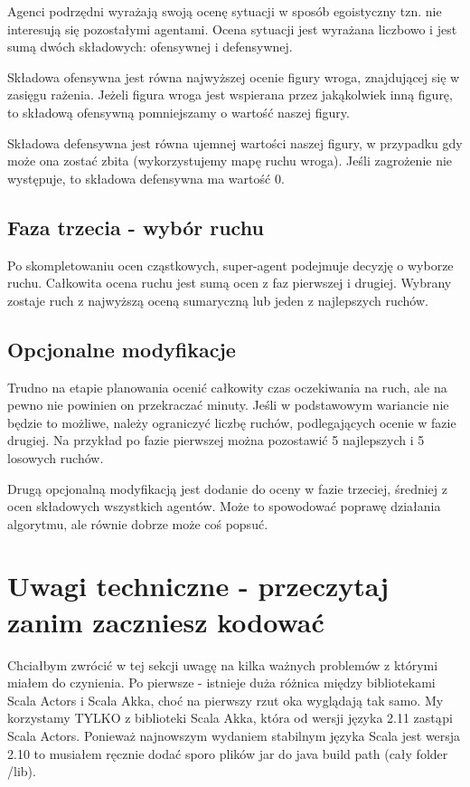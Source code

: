 \documentclass[a4paper,12pt,oneside,notitlepage,onecolumn]{article}
\begin{document}
Agenci podrzędni wyrażają swoją ocenę sytuacji w sposób egoistyczny tzn. nie interesują się pozostałymi agentami.
Ocena sytuacji jest wyrażana liczbowo i jest sumą dwóch składowych: ofensywnej i defensywnej.

Składowa ofensywna jest równa najwyższej ocenie figury wroga, znajdującej się w zasięgu rażenia.
Jeżeli figura wroga jest wspierana przez jakąkolwiek inną figurę, to składową ofensywną pomniejszamy o wartość naszej figury.

Składowa defensywna jest równa ujemnej wartości naszej figury, w przypadku gdy może ona zostać zbita (wykorzystujemy mapę ruchu wroga).
Jeśli zagrożenie nie występuje, to składowa defensywna ma wartość 0.

\subsection{Faza trzecia - wybór ruchu}
Po skompletowaniu ocen cząstkowych, super-agent podejmuje decyzję o wyborze ruchu.
Całkowita ocena ruchu jest sumą ocen z faz pierwszej i drugiej.
Wybrany zostaje ruch z najwyższą oceną sumaryczną lub jeden z najlepszych ruchów.

\subsection{Opcjonalne modyfikacje}
Trudno na etapie planowania ocenić całkowity czas oczekiwania na ruch, ale na pewno nie powinien on przekraczać minuty.
Jeśli w podstawowym wariancie nie będzie to możliwe, należy ograniczyć liczbę ruchów, podlegających ocenie w fazie drugiej.
Na przykład po fazie pierwszej można pozostawić 5 najlepszych i 5 losowych ruchów.

Drugą opcjonalną modyfikacją jest dodanie do oceny w fazie trzeciej, średniej z ocen składowych wszystkich agentów.
Może to spowodować poprawę działania algorytmu, ale równie dobrze może coś popsuć.

\section{Uwagi techniczne - przeczytaj zanim zaczniesz kodować}
Chciałbym zwrócić w tej sekcji uwagę na kilka ważnych problemów z którymi miałem do czynienia.
Po pierwsze - istnieje duża różnica między bibliotekami Scala Actors i Scala Akka, choć na pierwszy rzut oka wyglądają tak samo.
My korzystamy TYLKO z biblioteki Scala Akka, która od wersji języka 2.11 zastąpi Scala Actors.
Ponieważ najnowszym wydaniem stabilnym języka Scala jest wersja 2.10 to musiałem ręcznie dodać sporo plików jar do java build path (cały folder /lib).
\end{document}
